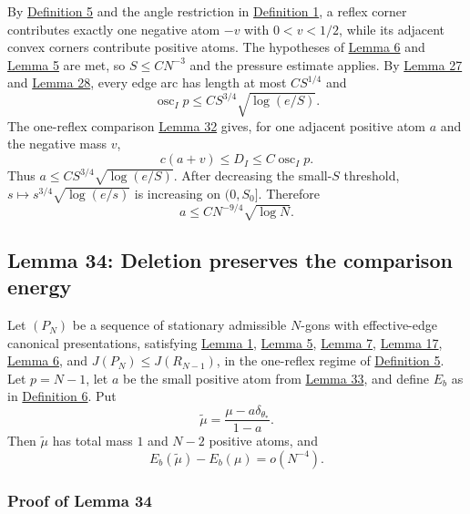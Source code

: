 \documentclass[11pt]{article}
\begin{document}
By \hyperref[def-turn-measure]{Definition 5} and the angle restriction
in \hyperref[def-admissible-polygon]{Definition 1}, a reflex corner
contributes exactly one negative atom \(-v\) with \(0<v<1/2\), while its
adjacent convex corners contribute positive atoms. The hypotheses of
\hyperref[lem-near-circle-conformal]{Lemma 6} and
\hyperref[lem-disk-perturbation]{Lemma 5} are met, so \(S\le CN^{-3}\)
and the pressure estimate applies. By \hyperref[lem-prevertex-gap]{Lemma
27} and \hyperref[lem-edge-pressure-oscillation]{Lemma 28}, every edge
arc has length at most \(CS^{1/4}\) and \[
\operatorname{osc}_I p\le CS^{3/4}\sqrt{\log(e/S)}.
\] The one-reflex comparison
\hyperref[lem-reflex-edge-pressure-comparison]{Lemma 32} gives, for one
adjacent positive atom \(a\) and the negative mass \(v\), \[
c(a+v)\le D_I\le C\operatorname{osc}_I p.
\] Thus \(a\le C S^{3/4}\sqrt{\log(e/S)}\). After decreasing the
small-\(S\) threshold, \(s\mapsto s^{3/4}\sqrt{\log(e/s)}\) is
increasing on \((0,S_0]\). Therefore \[
a\le C N^{-9/4}\sqrt{\log N}.
\]

\subsection{Lemma 34: Deletion preserves the comparison
energy}\label{lem-atom-deletion}

Let \((P_N)\) be a sequence of stationary admissible \(N\)-gons with
effective-edge canonical presentations, satisfying
\hyperref[lem-edge-moments]{Lemma 1},
\hyperref[lem-disk-perturbation]{Lemma 5},
\hyperref[lem-gradient-perturbation]{Lemma 7},
\hyperref[lem-spectral-core]{Lemma 17},
\hyperref[lem-near-circle-conformal]{Lemma 6}, and
\(J(P_N)\le J(R_{N-1})\), in the one-reflex regime of
\hyperref[def-turn-measure]{Definition 5}. Let \(p=N-1\), let \(a\) be
the small positive atom from
\hyperref[lem-single-reflex-small-atom]{Lemma 33}, and define \(E_b\) as
in \hyperref[def-positive-kernel]{Definition 6}. Put \[
\widetilde\mu=\frac{\mu-a\delta_{\theta_*}}{1-a}.
\] Then \(\widetilde\mu\) has total mass \(1\) and \(N-2\) positive
atoms, and \[
E_b(\widetilde\mu)-E_b(\mu)=o(N^{-4}).
\]

\subsubsection{Proof of Lemma 34}\label{proof-lem-atom-deletion}
\end{document}
